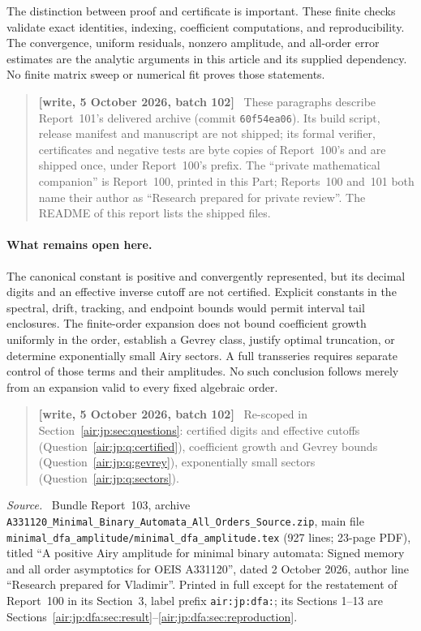 \documentclass[11pt,letterpaper]{article}
\numberwithin{equation}{section}
\theoremstyle{remark}
\newenvironment{partsource}{\par\medskip\noindent\begin{minipage}{\linewidth}\small\raggedright\textit{Source.}\ }{\end{minipage}\par\medskip}
\newenvironment{writenotejp}{\par\smallskip\begin{quote}\small\textbf{[write, 5 October 2026, batch 102]}\ }{\end{quote}\smallskip}
\newcommand{\repopath}[1]{\nolinkurl{#1}}
\begin{document}
The distinction between proof and certificate is important. These finite checks validate exact identities, indexing, coefficient computations, and reproducibility. The convergence, uniform residuals, nonzero amplitude, and all-order error estimates are the analytic arguments in this article and its supplied dependency. No finite matrix sweep or numerical fit proves those statements.
\begin{writenotejp}
These paragraphs describe Report~101's delivered archive (commit \texttt{60f54ea06}). Its build script, release manifest and manuscript are not shipped; its formal verifier, certificates and negative tests are byte copies of Report~100's and are shipped once, under Report~100's prefix. The ``private mathematical companion'' is Report~100, printed in this Part; Reports~100 and~101 both name their author as ``Research prepared for private review''. The README of this report lists the shipped files.
\end{writenotejp}

\paragraph{What remains open here.}
The canonical constant is positive and convergently represented, but its decimal digits and an effective inverse cutoff are not certified. Explicit constants in the spectral, drift, tracking, and endpoint bounds would permit interval tail enclosures. The finite-order expansion does not bound coefficient growth uniformly in the order, establish a Gevrey class, justify optimal truncation, or determine exponentially small Airy sectors. A full transseries requires separate control of those terms and their amplitudes. No such conclusion follows merely from an expansion valid to every fixed algebraic order.
\begin{writenotejp}
Re-scoped in Section~\ref{air:jp:sec:questions}: certified digits and effective cutoffs (Question~\ref{air:jp:q:certified}), coefficient growth and Gevrey bounds (Question~\ref{air:jp:q:gevrey}), exponentially small sectors (Question~\ref{air:jp:q:sectors}).
\end{writenotejp}

\bigskip{}\par\nopagebreak
\begin{partsource}
Bundle Report~103, archive \repopath{A331120_Minimal_Binary_Automata_All_Orders_Source.zip}, main file \repopath{minimal_dfa_amplitude/minimal_dfa_amplitude.tex} (927 lines; 23-page PDF), titled ``A positive Airy amplitude for minimal binary automata: Signed memory and all order asymptotics for OEIS A331120'', dated 2 October 2026, author line ``Research prepared for Vladimir''. Printed in full except for the restatement of Report~100 in its Section~3, label prefix \texttt{air:jp:dfa:}; its Sections 1--13 are Sections~\ref{air:jp:dfa:sec:result}--\ref{air:jp:dfa:sec:reproduction}.
\end{partsource}
\end{document}
